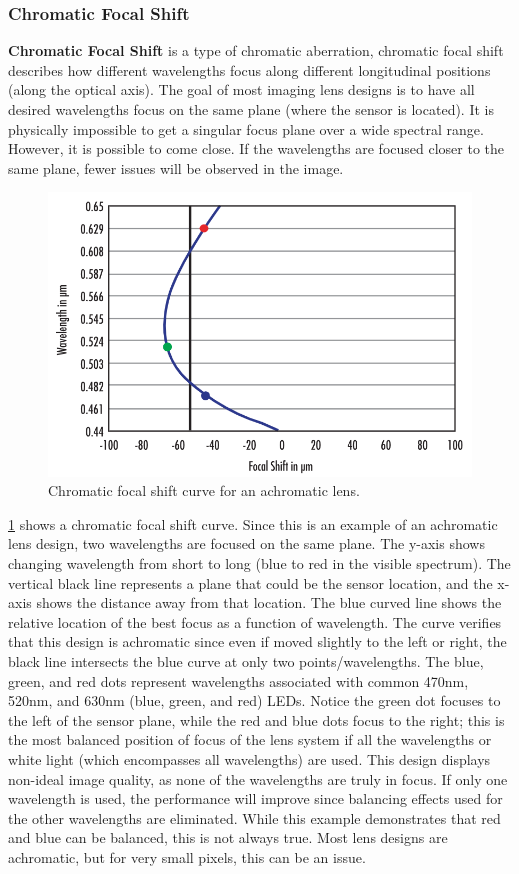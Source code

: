 \documentclass[10pt]{article}
\begin{document}
\begin{multicols}{2}
\subsubsection{Chromatic Focal Shift}
\textbf{Chromatic Focal Shift} is a type of chromatic aberration, chromatic focal shift describes how different wavelengths focus along different longitudinal positions (along the optical axis). The goal of most imaging lens designs is to have all desired wavelengths focus on the same plane (where the sensor is located). It is physically impossible to get a singular focus plane over a wide spectral range. However, it is possible to come close. If the wavelengths are focused closer to the same plane, fewer issues will be observed in the image.
\begin{figure}[H]
    \centering
    \includegraphics[width=0.8\linewidth]{Images/Week 1/achromat.png}
    \caption{Chromatic focal shift curve for an achromatic lens.}
    \label{fig:achromat}
\end{figure}
\ref{fig:achromat} shows a chromatic focal shift curve. Since this is an example of an achromatic lens design, two wavelengths are focused on the same plane. The y-axis shows changing wavelength from short to long (blue to red in the visible spectrum). The vertical black line represents a plane that could be the sensor location, and the x-axis shows the distance away from that location. The blue curved line shows the relative location of the best focus as a function of wavelength. The curve verifies that this design is achromatic since even if moved slightly to the left or right, the black line intersects the blue curve at only two points/wavelengths.
The blue, green, and red dots represent wavelengths associated with common 470nm, 520nm, and 630nm (blue, green, and red) LEDs. Notice the green dot focuses to the left of the sensor plane, while the red and blue dots focus to the right; this is the most balanced position of focus of the lens system if all the wavelengths or white light (which encompasses all wavelengths) are used. This design displays non-ideal image quality, as none of the wavelengths are truly in focus. If only one wavelength is used, the performance will improve since balancing effects used for the other wavelengths are eliminated. While this example demonstrates that red and blue can be balanced, this is not always true. Most lens designs are achromatic, but for very small pixels, this can be an issue.

\end{multicols}
\end{document}
